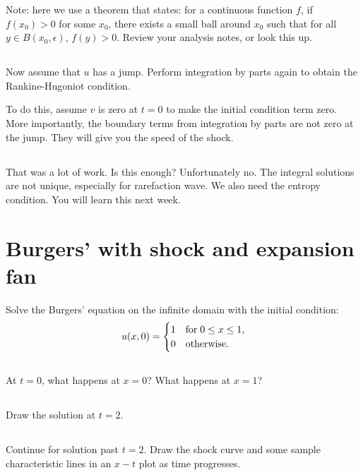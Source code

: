 \documentclass[11pt,letterpaper]{report}
\begin{document}
Note: here we use a theorem that states: for a continuous function $f$, if $f(x_0)>0$ for some $x_0$, there exists a small ball around $x_0$ such that for all $y\in B(x_0,\epsilon)$, $f(y)>0$. Review your analysis notes, or look this up.

\subsection{}
Now assume that $u$ has a jump. Perform integration by parts again to obtain the Rankine-Hugoniot condition.

To do this, assume $v$ is zero at $t=0$ to make the initial condition term zero. More importantly, the boundary terms from integration by parts are not zero at the jump. They will give you the speed of the shock.

\subsection{}
That was a lot of work. Is this enough? Unfortunately no. The integral solutions are not unique, especially for rarefaction wave. We also need the entropy condition. You will learn this next week.

\section{Burgers' with shock and expansion fan}
Solve the Burgers' equation on the infinite domain with the initial condition:
\begin{align}
    u(x,0) = \begin{cases}
        1 & \text{for\;} 0\leq x\leq 1,\\
        0 & \text{otherwise}.
    \end{cases}
\end{align}

\subsection{}
At $t=0$, what happens at $x=0$? What happens at $x=1$?

\subsection{}
Draw the solution at $t=2$. 

\subsection{}
Continue for solution past $t=2$. Draw the shock curve and some sample characteristic lines in an $x-t$ plot as time progresses. 
\end{document}
